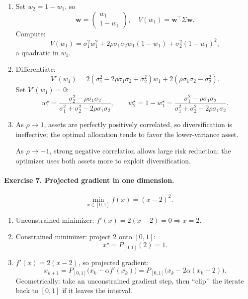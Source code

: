 \documentclass[11pt]{article}
\begin{document}
\begin{enumerate}
\item Set $w_2=1-w_1$, so
\[
\bm{w}=\begin{pmatrix}w_1\\1-w_1\end{pmatrix},
\quad
V(w_1)=\bm{w}^\top \Sigma \bm{w}.
\]
Compute:
\[
V(w_1)
= \sigma_1^2 w_1^2 + 2\rho\sigma_1\sigma_2 w_1(1-w_1) + \sigma_2^2 (1-w_1)^2,
\]
a quadratic in $w_1$.

\item Differentiate:
\[
V'(w_1) = 2(\sigma_1^2 - 2\rho\sigma_1\sigma_2 + \sigma_2^2)w_1
+ 2(\rho\sigma_1\sigma_2 - \sigma_2^2).
\]
Set $V'(w_1)=0$:
\[
w_1^\star
=
\frac{\sigma_2^2 - \rho\sigma_1\sigma_2}
{\sigma_1^2 + \sigma_2^2 - 2\rho\sigma_1\sigma_2},
\qquad
w_2^\star=1-w_1^\star
=
\frac{\sigma_1^2 - \rho\sigma_1\sigma_2}
{\sigma_1^2 + \sigma_2^2 - 2\rho\sigma_1\sigma_2}.
\]

\item As $\rho\to1$, assets are perfectly positively correlated, so diversification is ineffective; the optimal allocation tends to favor the lower-variance asset.

As $\rho\to-1$, strong negative correlation allows large risk reduction; the optimizer uses both assets more to exploit diversification.
\end{enumerate}

\bigskip

\paragraph{Exercise 7. Projected gradient in one dimension.}

\[
\min_{x\in[0,1]} f(x)=(x-2)^2.
\]

\begin{enumerate}
\item Unconstrained minimizer: $f'(x)=2(x-2)=0\Rightarrow x=2$.

\item Constrained minimizer: project $2$ onto $[0,1]$:
\[
x^\star = P_{[0,1]}(2)=1.
\]

\item $f'(x)=2(x-2)$, so projected gradient:
\[
x_{k+1} = P_{[0,1]}\bigl(x_k - \alpha f'(x_k)\bigr)
= P_{[0,1]}\bigl(x_k - 2\alpha(x_k-2)\bigr).
\]
Geometrically: take an unconstrained gradient step, then “clip’’ the iterate back to $[0,1]$ if it leaves the interval.
\end{enumerate}
\end{document}
